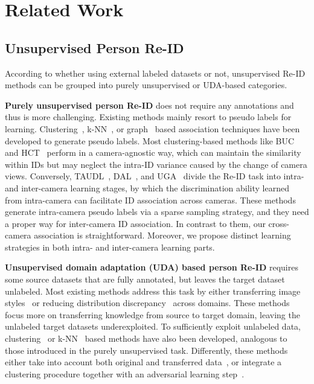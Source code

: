 \documentclass[letterpaper]{article} %
\begin{document}
\section{Related Work}
\subsection{Unsupervised Person Re-ID}
According to whether using external labeled datasets or not, unsupervised Re-ID methods can be grouped into purely unsupervised or UDA-based categories. 

\textbf{Purely unsupervised person Re-ID} does not require any annotations and thus is more challenging. Existing methods mainly resort to pseudo labels for learning. Clustering~\cite{lin2019aBottom,zeng2020hierarchical}, k-NN~\cite{li2018unsupervised,chen2018deepa}, or graph~\cite{ye2017dynamic,wu2019graph} based association techniques have been developed to generate pseudo labels. Most clustering-based methods like BUC~\cite{lin2019aBottom} and HCT~\cite{zeng2020hierarchical} perform in a camera-agnostic way, which can maintain the similarity within IDs but may neglect the intra-ID variance caused by the change of camera views. Conversely, TAUDL~\cite{li2018unsupervised}, DAL~\cite{chen2018deepa}, and UGA~\cite{wu2019graph} divide the Re-ID task into intra- and inter-camera learning stages, by which the discrimination ability learned from intra-camera can facilitate ID association across cameras. These methods generate intra-camera pseudo labels via a sparse sampling strategy, and they need a proper way for inter-camera ID association. In contrast to them, our cross-camera association is straightforward. Moreover, we propose distinct learning strategies in both intra- and inter-camera learning parts.



\textbf{Unsupervised domain adaptation (UDA) based person Re-ID} requires some source datasets that are fully annotated, but leaves the target dataset unlabeled. Most existing methods address this task by either transferring image styles~\cite{Wei2018PTGAN,Deng2018SPGAN,Liu2019ATNet} or reducing distribution discrepancy~\cite{qi2019DA,Wu2019CA} across domains. These methods focus more on transferring knowledge from source to target domain, leaving the unlabeled target datasets underexploited. To sufficiently exploit unlabeled data, clustering~\cite{unsup_clustering, zhai2020ad, ge2020self} or k-NN~\cite{zhong2019invariance} based methods have also been developed, analogous to those introduced in the purely unsupervised task. Differently, these methods either take into account both original and transferred data~\cite{unsup_clustering,zhong2019invariance,ge2020self}, or integrate a clustering procedure together with an adversarial learning step~\cite{zhai2020ad}. 
\end{document}
